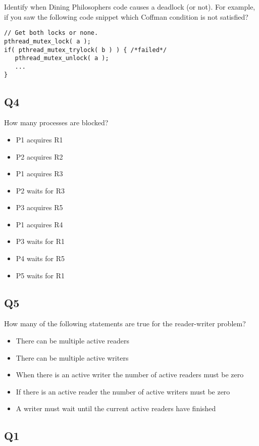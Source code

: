 Identify when Dining Philosophers code causes a deadlock (or not). For
example, if you saw the following code snippet which Coffman condition
is not satisfied?

\begin{verbatim}
// Get both locks or none.
pthread_mutex_lock( a );
if( pthread_mutex_trylock( b ) ) { /*failed*/
   pthread_mutex_unlock( a );
   ...
}
\end{verbatim}

\subsection{Q4}\label{q4-1}

How many processes are blocked?

\begin{itemize}
\tightlist
\item
  P1 acquires R1
\item
  P2 acquires R2
\item
  P1 acquires R3
\item
  P2 waits for R3
\item
  P3 acquires R5
\item
  P1 acquires R4
\item
  P3 waits for R1
\item
  P4 waits for R5
\item
  P5 waits for R1
\end{itemize}

\subsection{Q5}\label{q5-1}

How many of the following statements are true for the reader-writer
problem?

\begin{itemize}
\tightlist
\item
  There can be multiple active readers
\item
  There can be multiple active writers
\item
  When there is an active writer the number of active readers must be
  zero
\item
  If there is an active reader the number of active writers must be zero
\item
  A writer must wait until the current active readers have finished
\end{itemize}

\subsection{Q1}\label{q1-2}

